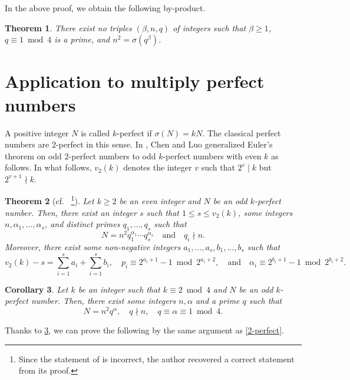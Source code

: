 \documentclass[11pt]{amsart}
\theoremstyle{plain}
\newtheorem{theorem}{Theorem}[section]
\newtheorem{corollary}[theorem]{Corollary}
\theoremstyle{definition}
\begin{document}
In the above proof,
we obtain the following by-product.

\begin{theorem} \label{by-product}
There exist no triples $(\beta, n, q)$ of integers such that
$\beta \geq 1$, $q \equiv 1 \bmod 4$ is a prime, and $n^{2} = \sigma(q^{\beta})$.
\end{theorem}



\section{Application to multiply perfect numbers}

A positive integer $N$ is called $k$-perfect if $\sigma(N) = kN$.
The classical perfect numbers are $2$-perfect in this sense.
In \cite{Chen-Luo}, Chen and Luo generalized Euler's theorem on odd $2$-perfect numbers to odd $k$-perfect numbers with even $k$ as follows.
In what follows, $v_{2}(k)$ denotes the integer $v$ such that $2^{v} \mid k$ but $2^{v+1} \nmid k$.

\begin{theorem}[{cf.\ \cite[Theorem 2.2]{Chen-Luo}} \label{Chen-Luo}
\footnote{
	Since the statement of \cite[Theorem 2.2]{Chen-Luo} is incorrect,
	the author recovered a correct statement from its proof.
	}
]
Let $k \geq 2$ be an even integer and $N$ be an odd $k$-perfect number.
Then, there exist an integer $s$ such that $1 \leq s \leq v_{2}(k)$,
some integers $n, \alpha_{1}, \dots, \alpha_{s}$,
and distinct primes $q_{1}, \dots, q_{s}$ such that
\[
	N = n^{2}q_{1}^{\alpha_{1}} \cdots q_{s}^{\alpha_{s}}
	\quad \text{and}
	\quad q_{i} \nmid n.
\]
Moreover,
there exist some non-negative integers $a_{1}, \dots, a_{s}, b_{1}, \dots, b_{s}$ such that
\[
	v_{2}(k) - s = \sum_{i = 1}^{s} a_{i} + \sum_{i = 1}^{s} b_{i},
	\quad p_{i} \equiv 2^{a_{i}+1}-1 \bmod 2^{a_{i}+2},
	\quad \text{and}
	\quad \alpha_{i} \equiv 2^{b_{i}+1}-1 \bmod 2^{b_{i}+2}.
\]
\end{theorem}

\begin{corollary} \label{Chen-Luo2}
Let $k$ be an integer such that $k \equiv 2 \bmod 4$ and $N$ be an odd $k$-perfect number.
Then, there exist some integers $n, \alpha$ and a prime $q$ such that
\[
	N = n^{2}q^{\alpha},
	\quad q \nmid n,
	\quad q \equiv \alpha \equiv 1 \bmod 4.
\]
\end{corollary}



Thanks to \cref{Chen-Luo2},
we can prove the following by the same argument as \cref{2-perfect}.
\end{document}
